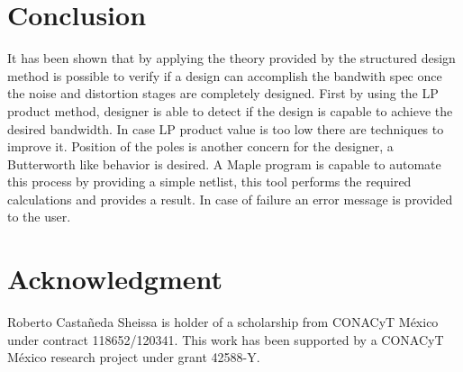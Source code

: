 \documentclass[conference]{IEEEtran}
\begin{document}
\section{Conclusion}
It has been shown that by applying the theory provided by the structured design method is possible to verify if a design can accomplish the bandwith spec once the noise and distortion stages are completely designed. First by using the LP product method, designer is able to detect if the design is capable to achieve the desired bandwidth. In case LP product value is too low there are techniques to improve it. Position of the poles is another concern for the designer, a Butterworth like behavior is desired. A Maple program is capable to automate this process by providing a simple netlist, this tool performs the required calculations and provides a result. In case of failure an error message is provided to the user. 

\section*{Acknowledgment}
Roberto Casta\~neda Sheissa is holder of a scholarship from CONACyT M\'exico under contract 118652/120341. This work has been supported by a CONACyT M\'exico research project under grant 42588-Y.





\end{document}
